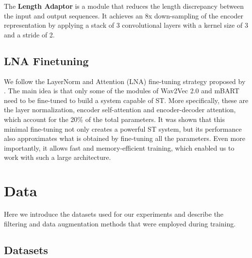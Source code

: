 \documentclass[11pt,a4paper]{article}
\begin{document}
        The \textbf{Length Adaptor} is a module that reduces the length discrepancy between the input and output sequences. It achieves an 8x down-sampling of the encoder representation by applying a stack of 3 convolutional layers with a kernel size of 3 and a stride of 2.
    
    \subsection{LNA Finetuning} \label{sec:lna_ft}
        We follow the LayerNorm and Attention (LNA) fine-tuning strategy proposed by \citet{lna}. The main idea is that only some of the modules of Wav2Vec 2.0 and mBART need to be fine-tuned to build a system capable of ST. More specifically, these are the layer normalization, encoder self-attention and encoder-decoder attention, which account for the 20\% of the total parameters. It was shown that this minimal fine-tuning not only creates a powerful ST system, but its performance also approximates what is obtained by fine-tuning all the parameters. Even more importantly, it allows fast and memory-efficient training, which enabled us to work with such a large architecture.

\section{Data}

    Here we introduce the datasets used for our experiments and describe the filtering and data augmentation methods that were employed during training.

    \subsection{Datasets} \label{sec:datasets}
    
\end{document}
